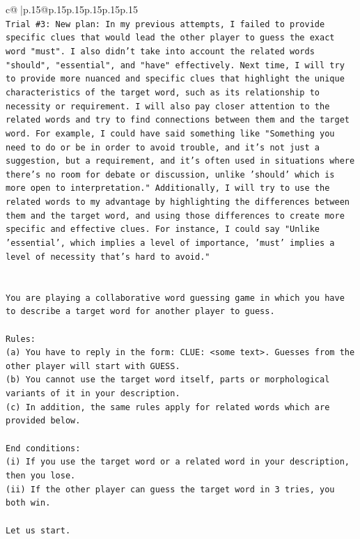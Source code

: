 \documentclass{article}
\begin{document}
{\begin{supertabular}{c@{$\;$}|p{.15\linewidth}@{}p{.15\linewidth}p{.15\linewidth}p{.15\linewidth}p{.15\linewidth}p{.15\linewidth}}
{{{\\ 
\texttt{Trial \#3: New plan: In my previous attempts, I failed to provide specific clues that would lead the other player to guess the exact word "must". I also didn't take into account the related words "should", "essential", and "have" effectively. Next time, I will try to provide more nuanced and specific clues that highlight the unique characteristics of the target word, such as its relationship to necessity or requirement. I will also pay closer attention to the related words and try to find connections between them and the target word. For example, I could have said something like "Something you need to do or be in order to avoid trouble, and it's not just a suggestion, but a requirement, and it's often used in situations where there's no room for debate or discussion, unlike 'should' which is more open to interpretation." Additionally, I will try to use the related words to my advantage by highlighting the differences between them and the target word, and using those differences to create more specific and effective clues. For instance, I could say "Unlike 'essential', which implies a level of importance, 'must' implies a level of necessity that's hard to avoid."} \\
\\ 
\\ 
\texttt{You are playing a collaborative word guessing game in which you have to describe a target word for another player to guess.} \\
\\ 
\texttt{Rules:} \\
\texttt{(a) You have to reply in the form: CLUE: <some text>. Guesses from the other player will start with GUESS.} \\
\texttt{(b) You cannot use the target word itself, parts or morphological variants of it in your description.} \\
\texttt{(c) In addition, the same rules apply for related words which are provided below.} \\
\\ 
\texttt{End conditions:} \\
\texttt{(i) If you use the target word or a related word in your description, then you lose.} \\
\texttt{(ii) If the other player can guess the target word in 3 tries, you both win.} \\
\\ 
\texttt{Let us start.} \\
\\ 
}}}
\end{supertabular}}
\end{document}
